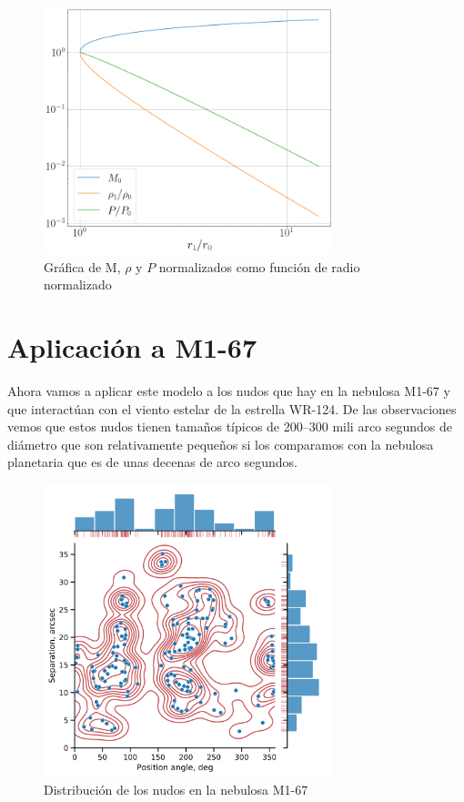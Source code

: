 \documentclass{book}
\begin{document}
\begin{figure}[h]
    \centering    \includegraphics[width=0.75\textwidth]{images Chapter 2/C2_results.png}
    \caption{Gráfica de M, $\rho$ y $P$ normalizados como función de radio normalizado}
    \label{fig:grafica_C2}
\end{figure}




\chapter{Aplicación a M1-67}

Ahora vamos a aplicar este modelo a los nudos que hay en la nebulosa M1-67 y que interactúan con el viento estelar de la estrella WR-124. De las observaciones vemos que estos nudos tienen tamaños típicos de 200--300 mili arco segundos de diámetro que son relativamente pequeños si los comparamos con la nebulosa planetaria que es de unas decenas de arco segundos. 

\begin{figure}[h!]
    \centering    \includegraphics[width=0.75\textwidth]{images Chapter 2/C2_nudos_distribucion.png}
    \caption{Distribución de los nudos en la nebulosa M1-67}
    \label{fig:dis_nudos}
\end{figure}
\end{document}
